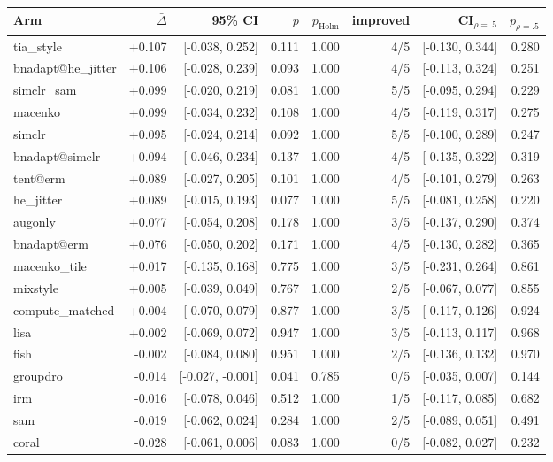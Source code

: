 \begin{tabular}{lrrrrrrr}
\toprule
Arm & $\bar\Delta$ & 95\% CI & $p$ & $p_\text{Holm}$ & improved & CI$_{\rho=.5}$ & $p_{\rho=.5}$ \\
\midrule
tia\_style & +0.107 & [-0.038, 0.252] & 0.111 & 1.000 & 4/5 & [-0.130, 0.344] & 0.280 \\
bnadapt@he\_jitter & +0.106 & [-0.028, 0.239] & 0.093 & 1.000 & 4/5 & [-0.113, 0.324] & 0.251 \\
simclr\_sam & +0.099 & [-0.020, 0.219] & 0.081 & 1.000 & 5/5 & [-0.095, 0.294] & 0.229 \\
macenko & +0.099 & [-0.034, 0.232] & 0.108 & 1.000 & 4/5 & [-0.119, 0.317] & 0.275 \\
simclr & +0.095 & [-0.024, 0.214] & 0.092 & 1.000 & 5/5 & [-0.100, 0.289] & 0.247 \\
bnadapt@simclr & +0.094 & [-0.046, 0.234] & 0.137 & 1.000 & 4/5 & [-0.135, 0.322] & 0.319 \\
tent@erm & +0.089 & [-0.027, 0.205] & 0.101 & 1.000 & 4/5 & [-0.101, 0.279] & 0.263 \\
he\_jitter & +0.089 & [-0.015, 0.193] & 0.077 & 1.000 & 5/5 & [-0.081, 0.258] & 0.220 \\
augonly & +0.077 & [-0.054, 0.208] & 0.178 & 1.000 & 3/5 & [-0.137, 0.290] & 0.374 \\
bnadapt@erm & +0.076 & [-0.050, 0.202] & 0.171 & 1.000 & 4/5 & [-0.130, 0.282] & 0.365 \\
macenko\_tile & +0.017 & [-0.135, 0.168] & 0.775 & 1.000 & 3/5 & [-0.231, 0.264] & 0.861 \\
mixstyle & +0.005 & [-0.039, 0.049] & 0.767 & 1.000 & 2/5 & [-0.067, 0.077] & 0.855 \\
compute\_matched & +0.004 & [-0.070, 0.079] & 0.877 & 1.000 & 3/5 & [-0.117, 0.126] & 0.924 \\
lisa & +0.002 & [-0.069, 0.072] & 0.947 & 1.000 & 3/5 & [-0.113, 0.117] & 0.968 \\
fish & -0.002 & [-0.084, 0.080] & 0.951 & 1.000 & 2/5 & [-0.136, 0.132] & 0.970 \\
groupdro & -0.014 & [-0.027, -0.001] & 0.041 & 0.785 & 0/5 & [-0.035, 0.007] & 0.144 \\
irm & -0.016 & [-0.078, 0.046] & 0.512 & 1.000 & 1/5 & [-0.117, 0.085] & 0.682 \\
sam & -0.019 & [-0.062, 0.024] & 0.284 & 1.000 & 2/5 & [-0.089, 0.051] & 0.491 \\
coral & -0.028 & [-0.061, 0.006] & 0.083 & 1.000 & 0/5 & [-0.082, 0.027] & 0.232 \\
\bottomrule
\end{tabular}
